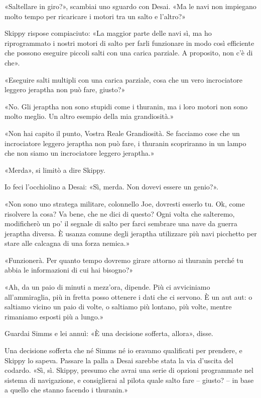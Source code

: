 «Saltellare in giro?», scambiai uno sguardo con Desai. «Ma le navi non
impiegano molto tempo per ricaricare i motori tra un salto e l'altro?»

Skippy rispose compiaciuto: «La maggior parte delle navi sì, ma ho
riprogrammato i nostri motori di salto per farli funzionare in modo così
efficiente che possono eseguire piccoli salti con una carica parziale. A
proposito, non c'è di che».

«Eseguire salti multipli con una carica parziale, cosa che un vero
incrociatore leggero jeraptha non può fare, giusto?»

«No. Gli jeraptha non sono stupidi come i thuranin, ma i loro motori non
sono molto meglio. Un altro esempio della mia grandiosità.»

«Non hai capito il punto, Vostra Reale Grandiosità. Se facciamo cose che
un incrociatore leggero jeraptha non può fare, i thuranin scopriranno in
un lampo che non siamo un incrociatore leggero jeraptha.»

«Merda», si limitò a dire Skippy.

Io feci l'occhiolino a Desai: «Sì, merda. Non dovevi essere un genio?».

«Non sono uno stratega militare, colonnello Joe, dovresti esserlo tu.
Ok, come risolvere la cosa? Va bene, che ne dici di questo? Ogni volta
che salteremo, modificherò un po' il segnale di salto per farci sembrare
una nave da guerra jeraptha diversa. È usanza comune degli jeraptha
utilizzare più navi picchetto per stare alle calcagna di una forza
nemica.»

«Funzionerà. Per quanto tempo dovremo girare attorno ai thuranin perché
tu abbia le informazioni di cui hai bisogno?»

«Ah, da un paio di minuti a mezz'ora, dipende. Più ci avviciniamo
all'ammiraglia, più in fretta posso ottenere i dati che ci servono. È un
aut aut: o saltiamo vicino un paio di volte, o saltiamo più lontano, più
volte, mentre rimaniamo esposti più a lungo.»

Guardai Simms e lei annuì: «È una decisione sofferta, allora», disse.

Una decisione sofferta che né Simms né io eravamo qualificati per
prendere, e Skippy lo sapeva. Passare la palla a Desai sarebbe stata la
via d'uscita del codardo. «Sì, sì. Skippy, presumo che avrai una serie
di opzioni programmate nel sistema di navigazione, e consiglierai al
pilota quale salto fare -- giusto? -- in base a quello che stanno
facendo i thuranin.»

